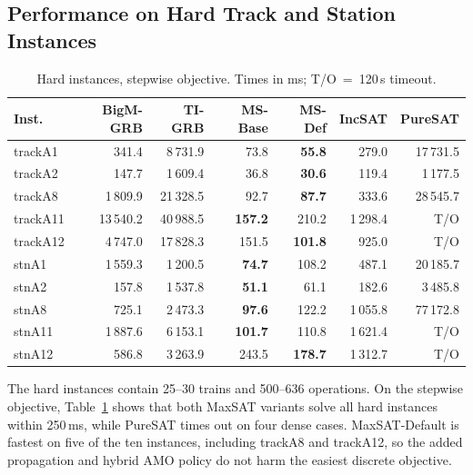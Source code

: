 \documentclass[runningheads]{llncs}
\begin{document}
\subsection{Performance on Hard Track and Station Instances}
\label{subsec:results-hard}

\begin{table}
\centering
\caption{Hard instances, stepwise objective. Times in ms; T/O~=~120\,s timeout.}
\label{tab:hard-step}
\scriptsize
\setlength{\tabcolsep}{4.5pt}
\renewcommand{\arraystretch}{1.0}
\begin{tabular}{lrrrrrr}
\toprule
Inst. & BigM-GRB & TI-GRB & MS-Base & MS-Def & IncSAT & PureSAT \\
\midrule
trackA1 & 341.4 & 8\,731.9 & 73.8 & \textbf{55.8} & 279.0 & 17\,731.5 \\
trackA2 & 147.7 & 1\,609.4 & 36.8 & \textbf{30.6} & 119.4 & 1\,177.5 \\
trackA8 & 1\,809.9 & 21\,328.5 & 92.7 & \textbf{87.7} & 333.6 & 28\,545.7 \\
trackA11 & 13\,540.2 & 40\,988.5 & \textbf{157.2} & 210.2 & 1\,298.4 & T/O \\
trackA12 & 4\,747.0 & 17\,828.3 & 151.5 & \textbf{101.8} & 925.0 & T/O \\
stnA1 & 1\,559.3 & 1\,200.5 & \textbf{74.7} & 108.2 & 487.1 & 20\,185.7 \\
stnA2 & 157.8 & 1\,537.8 & \textbf{51.1} & 61.1 & 182.6 & 3\,485.8 \\
stnA8 & 725.1 & 2\,473.3 & \textbf{97.6} & 122.2 & 1\,055.8 & 77\,172.8 \\
stnA11 & 1\,887.6 & 6\,153.1 & \textbf{101.7} & 110.8 & 1\,621.4 & T/O \\
stnA12 & 586.8 & 3\,263.9 & 243.5 & \textbf{178.7} & 1\,312.7 & T/O \\
\bottomrule
\end{tabular}
\end{table}

The hard instances contain 25--30 trains and 500--636 operations. On the
stepwise objective, Table~\ref{tab:hard-step} shows that both MaxSAT variants
solve all hard instances within 250\,ms, while PureSAT times out on four dense
cases. MaxSAT-Default is fastest on five of the ten instances, including
trackA8 and trackA12, so the added propagation and hybrid AMO policy do not
harm the easiest discrete objective.
\end{document}
